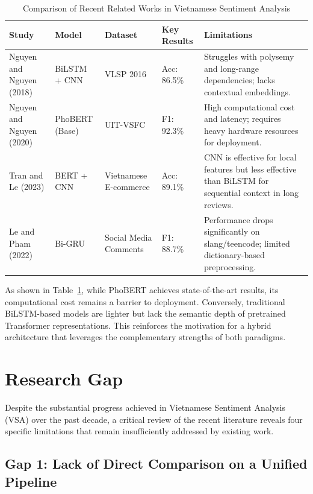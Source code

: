 \documentclass[12pt]{report} %
\begin{document}
\begin{table}[h]
\centering
\caption{Comparison of Recent Related Works in Vietnamese Sentiment Analysis}
\label{tab:related-work}
\begin{tabular}{|p{2.3cm}|p{2.2cm}|p{2.1cm}|p{1.7cm}|p{4cm}|}
\hline
\textbf{Study} & \textbf{Model} & \textbf{Dataset} & \textbf{Key Results} & \textbf{Limitations} \\
\hline
Nguyen and Nguyen (2018) \cite{nguyen_2018_dl} & BiLSTM + CNN & VLSP 2016 & Acc: 86.5\% & Struggles with polysemy and long-range dependencies; lacks contextual embeddings. \\
\hline
Nguyen and Nguyen (2020) \cite{nguyen2020phobert} & PhoBERT (Base) & UIT-VSFC & F1: 92.3\% & High computational cost and latency; requires heavy hardware resources for deployment. \\
\hline
Tran and Le (2023) \cite{tran_2023_hybrid} & BERT + CNN & Vietnamese E-commerce & Acc: 89.1\% & CNN is effective for local features but less effective than BiLSTM for sequential context in long reviews. \\
\hline
Le and Pham (2022) \cite{le_2022_social} & Bi-GRU & Social Media Comments & F1: 88.7\% & Performance drops significantly on slang/teencode; limited dictionary-based preprocessing. \\
\hline
\end{tabular}
\end{table}

As shown in Table~\ref{tab:related-work}, while PhoBERT achieves state-of-the-art results, its computational cost remains a barrier to deployment. Conversely, traditional BiLSTM-based models are lighter but lack the semantic depth of pretrained Transformer representations. This reinforces the motivation for a hybrid architecture that leverages the complementary strengths of both paradigms.

\section{Research Gap}

Despite the substantial progress achieved in Vietnamese Sentiment Analysis (VSA) over the past decade, a critical review of the recent literature reveals four specific limitations that remain insufficiently addressed by existing work.

\subsection*{Gap 1: Lack of Direct Comparison on a Unified Pipeline}
\end{document}

